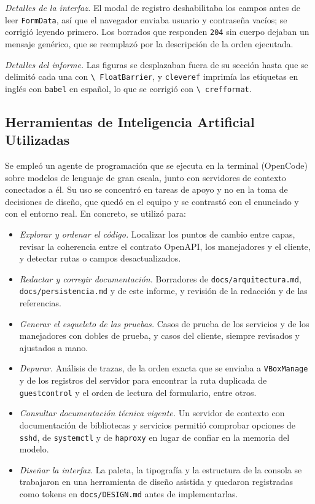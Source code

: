 \emph{Detalles de la interfaz.} El modal de registro deshabilitaba los
campos antes de leer \texttt{FormData}, así que el navegador enviaba
usuario y contraseña vacíos; se corrigió leyendo primero. Los borrados
que responden \texttt{204} sin cuerpo dejaban un mensaje genérico, que se
reemplazó por la descripción de la orden ejecutada.

\emph{Detalles del informe.} Las figuras se desplazaban fuera de su
sección hasta que se delimitó cada una con \texttt{\textbackslash
FloatBarrier}, y \texttt{cleveref} imprimía las etiquetas en inglés con
\texttt{babel} en español, lo que se corrigió con \texttt{\textbackslash
crefformat}.

\subsection{Herramientas de Inteligencia Artificial Utilizadas}
\label{sec:herramientas-ia}

Se empleó un agente de programación que se ejecuta en la terminal
(OpenCode) sobre modelos de lenguaje de gran escala, junto con servidores
de contexto conectados a él. Su uso se concentró en tareas de apoyo y no
en la toma de decisiones de diseño, que quedó en el equipo y se contrastó
con el enunciado y con el entorno real. En concreto, se utilizó para:

\begin{itemize}
  \item \emph{Explorar y ordenar el código.} Localizar los puntos de
  cambio entre capas, revisar la coherencia entre el contrato OpenAPI,
  los manejadores y el cliente, y detectar rutas o campos
  desactualizados.
  \item \emph{Redactar y corregir documentación.} Borradores de
  \texttt{docs/arquitectura.md}, \texttt{docs/persistencia.md} y de este
  informe, y revisión de la redacción y de las referencias.
  \item \emph{Generar el esqueleto de las pruebas.} Casos de prueba de
  los servicios y de los manejadores con dobles de prueba, y casos del
  cliente, siempre revisados y ajustados a mano.
  \item \emph{Depurar.} Análisis de trazas, de la orden exacta que se
  enviaba a \texttt{VBoxManage} y de los registros del servidor para
  encontrar la ruta duplicada de \texttt{guestcontrol} y el orden de
  lectura del formulario, entre otros.
  \item \emph{Consultar documentación técnica vigente.} Un servidor de
  contexto con documentación de bibliotecas y servicios permitió
  comprobar opciones de \texttt{sshd}, de \texttt{systemctl} y de
  \texttt{haproxy} en lugar de confiar en la memoria del modelo.
  \item \emph{Diseñar la interfaz.} La paleta, la tipografía y la
  estructura de la consola se trabajaron en una herramienta de diseño
  asistida y quedaron registradas como tokens en
  \texttt{docs/DESIGN.md} antes de implementarlas.
\end{itemize}

